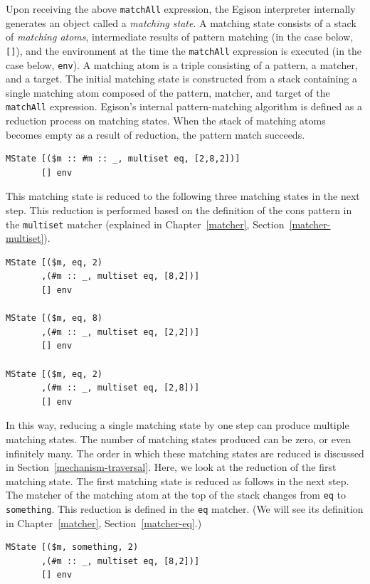 Upon receiving the above \lstinline{matchAll} expression, the Egison interpreter internally generates an object called a \emph{matching state}.
A matching state consists of a stack of \emph{matching atoms}, intermediate results of pattern matching (in the case below, \lstinline{[]}), and the environment at the time the \lstinline{matchAll} expression is executed (in the case below, \lstinline{env}).
A matching atom is a triple consisting of a pattern, a matcher, and a target.
The initial matching state is constructed from a stack containing a single matching atom composed of the pattern, matcher, and target of the \lstinline{matchAll} expression.
Egison's internal pattern-matching algorithm is defined as a reduction process on matching states.
When the stack of matching atoms becomes empty as a result of reduction, the pattern match succeeds.
\begin{lstlisting}[language=egison,numbers=none]
MState [($m :: #m :: _, multiset eq, [2,8,2])]
       [] env
\end{lstlisting}
This matching state is reduced to the following three matching states in the next step.
This reduction is performed based on the definition of the cons pattern in the \lstinline{multiset} matcher (explained in Chapter~\ref{matcher}, Section~\ref{matcher-multiset}).
\begin{lstlisting}[language=egison,numbers=none]
MState [($m, eq, 2)
       ,(#m :: _, multiset eq, [8,2])]
       [] env

MState [($m, eq, 8)
       ,(#m :: _, multiset eq, [2,2])]
       [] env

MState [($m, eq, 2)
       ,(#m :: _, multiset eq, [2,8])]
       [] env
\end{lstlisting}
In this way, reducing a single matching state by one step can produce multiple matching states.
The number of matching states produced can be zero, or even infinitely many.
The order in which these matching states are reduced is discussed in Section~\ref{mechanism-traversal}.
Here, we look at the reduction of the first matching state.
The first matching state is reduced as follows in the next step.
The matcher of the matching atom at the top of the stack changes from \lstinline{eq} to \lstinline{something}.
This reduction is defined in the \lstinline{eq} matcher. (We will see its definition in Chapter~\ref{matcher}, Section~\ref{matcher-eq}.)
\begin{lstlisting}[language=egison,numbers=none]
MState [($m, something, 2)
       ,(#m :: _, multiset eq, [8,2])]
       [] env
\end{lstlisting}
